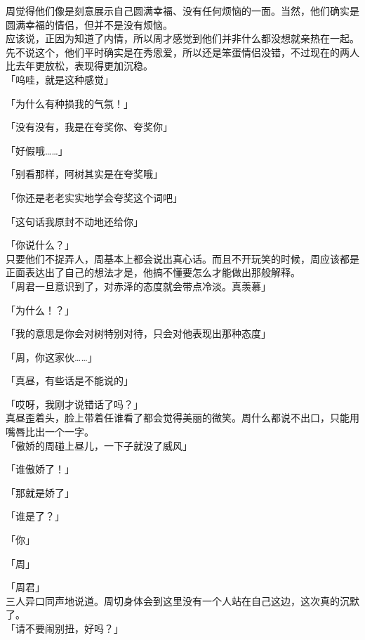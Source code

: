 周觉得他们像是刻意展示自己圆满幸福、没有任何烦恼的一面。当然，他们确实是圆满幸福的情侣，但并不是没有烦恼。\\

应该说，正因为知道了内情，所以周才感觉到他们并非什么都没想就亲热在一起。\\

先不说这个，他们平时确实是在秀恩爱，所以还是笨蛋情侣没错，不过现在的两人比去年更放松，表现得更加沉稳。\\

「呜哇，就是这种感觉」

「为什么有种损我的气氛！」

「没有没有，我是在夸奖你、夸奖你」

「好假哦……」

「别看那样，阿树其实是在夸奖哦」

「你还是老老实实地学会夸奖这个词吧」

「这句话我原封不动地还给你」

「你说什么？」\\

只要他们不捉弄人，周基本上都会说出真心话。而且不开玩笑的时候，周应该都是正面表达出了自己的想法才是，他搞不懂要怎么才能做出那般解释。\\

「周君一旦意识到了，对赤泽的态度就会带点冷淡。真羡慕」

「为什么！？」

「我的意思是你会对树特别对待，只会对他表现出那种态度」

「周，你这家伙……」

「真昼，有些话是不能说的」

「哎呀，我刚才说错话了吗？」\\

真昼歪着头，脸上带着任谁看了都会觉得美丽的微笑。周什么都说不出口，只能用嘴唇比出一个一字。\\

「傲娇的周碰上昼儿，一下子就没了威风」

「谁傲娇了！」

「那就是娇了」

「谁是了？」

「你」

「周」

「周君」\\

三人异口同声地说道。周切身体会到这里没有一个人站在自己这边，这次真的沉默了。\\

「请不要闹别扭，好吗？」\\

